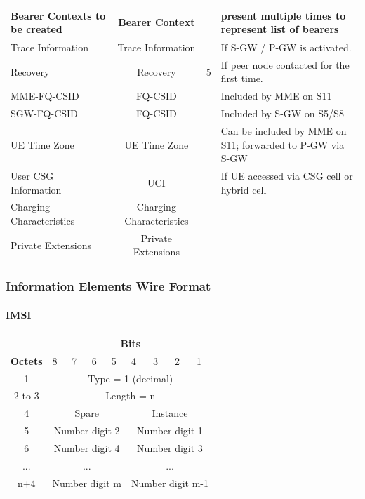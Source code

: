 \begin{longtabu}{|p{2cm}|c|p{1.5cm}|p{8cm}|}
Bearer Contexts to be created				& Bearer Context			& 						& present multiple times to represent list of bearers \\ \hline
Trace Information							& Trace Information 		& 						& If S-GW / P-GW is activated. \\ \hline
Recovery									& Recovery					& 5						& If peer node contacted for the first time. \\ \hline
MME-FQ-CSID									& FQ-CSID					& 						& Included by MME on S11 \\ \hline
SGW-FQ-CSID									& FQ-CSID					& 						& Included by S-GW on S5/S8 \\ \hline
UE Time Zone								& UE Time Zone 				& 						& Can be included by MME on S11; forwarded to P-GW via S-GW \\ \hline
User CSG Information						& UCI						& 						& If UE accessed via CSG cell or hybrid cell \\ \hline
Charging Characteristics					& Charging Characteristics	&						& \\ \hline
Private Extensions							& Private Extensions		&						& \\ \hline

\end{longtabu}

\subsubsection{Information Elements Wire Format}

\paragraph{IMSI}

\begin{tabular}{c|p{1cm}|p{1cm}|p{1cm}|p{1cm}|p{1cm}|p{1cm}|p{1cm}|p{1cm}|}
\multicolumn{1}{c}{} & \multicolumn{8}{c}{\textbf{Bits}} \\
\cline{2-9} \textbf{Octets} & 8 & 7 & 6 & 5 & 4 & 3 & 2 & 1 \\ 
\cline{2-9} 1 & \multicolumn{8}{c|}{Type = 1 (decimal)} \\ 
\cline{2-9} 2 to 3 & \multicolumn{8}{c|}{Length = n}  \\ 
\cline{2-9} 4 & \multicolumn{4}{c|}{Spare} & \multicolumn{4}{c|}{Instance} \\ 
\cline{2-9} 5 & \multicolumn{4}{c|}{Number digit 2} & \multicolumn{4}{c|}{Number digit 1} \\ 
\cline{2-9} 6 & \multicolumn{4}{c|}{Number digit 4} & \multicolumn{4}{c|}{Number digit 3} \\ 
\cline{2-9} ... & \multicolumn{4}{c|}{...} & \multicolumn{4}{c|}{...} \\ 
\cline{2-9} n+4 & \multicolumn{4}{c|}{Number digit m} & \multicolumn{4}{c|}{Number digit m-1} \\ 
\cline{2-9}
\end{tabular} 

